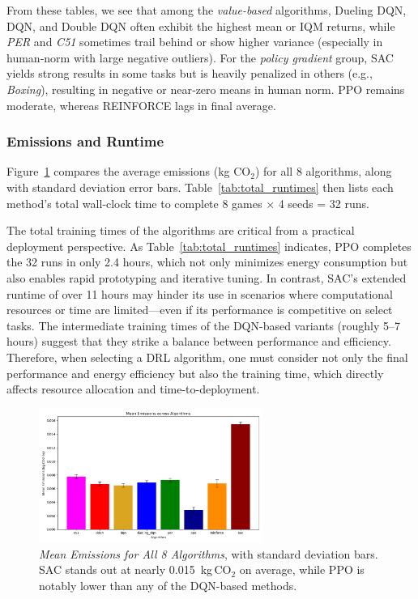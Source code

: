 From these tables, we see that among the \emph{value-based} algorithms, 
Dueling DQN, DQN, and Double DQN often exhibit the highest mean or IQM returns, while 
\emph{PER} and \emph{C51} sometimes trail behind or show higher variance (especially in 
human‐norm with large negative outliers). For the \emph{policy gradient} group, SAC yields strong 
results in some tasks but is heavily penalized in others (e.g., \emph{Boxing}), resulting 
in negative or near‐zero means in human norm. PPO remains moderate, whereas REINFORCE 
lags in final average.

\subsubsection{Emissions and Runtime}

Figure~\ref{fig:barplot_emissions_total} compares the average emissions (kg CO$_2$) for 
all 8 algorithms, along with standard deviation error bars. Table~\ref{tab:total_runtimes} 
then lists each method's total wall‐clock time to complete 8 games × 4 seeds = 32 runs.

The total training times of the algorithms are critical from a practical deployment perspective. As Table~\ref{tab:total_runtimes} indicates, PPO completes the 32 runs in only 2.4 hours, which not only minimizes energy consumption but also enables rapid prototyping and iterative tuning. In contrast, SAC's extended runtime of over 11 hours may hinder its use in scenarios where computational resources or time are limited—even if its performance is competitive on select tasks. The intermediate training times of the DQN-based variants (roughly 5–7 hours) suggest that they strike a balance between performance and efficiency. Therefore, when selecting a DRL algorithm, one must consider not only the final performance and energy efficiency but also the training time, which directly affects resource allocation and time-to-deployment.

\begin{figure} 
	\centering
	\includegraphics[width=0.65\textwidth]{figures/comparison/barplot_emissions_total.png}
	\caption{\emph{Mean Emissions for All 8 Algorithms}, with standard deviation bars.
		SAC stands out at nearly 0.015~kg\,CO$_2$ on average, while PPO is notably lower than
		any of the DQN-based methods.}
	\label{fig:barplot_emissions_total}
\end{figure}

